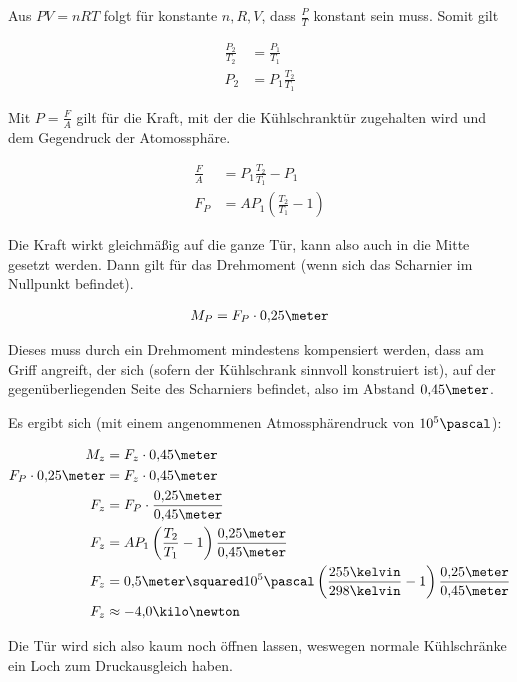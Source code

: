 \documentclass[a4paper,german,12pt,smallheadings]{scrartcl}
\begin{document}
Aus $PV = nRT$ folgt für konstante $n, R, V$, dass $\frac{P}{T}$ konstant sein muss. Somit gilt

\begin{align*}
  \frac{P_2}{T_2} &= \frac{P_1}{T_1} \\
  P_2 &= P_1 \frac{T_2}{T_1}
\end{align*}

Mit $P = \frac{F}{A}$ gilt für die Kraft, mit der die Kühlschranktür zugehalten wird und dem Gegendruck der Atomossphäre.

\begin{align*}
  \frac{F}{A} &= P_1 \frac{T_2}{T_1} - P_1 \\
  F_P &= A P_1 \left(\frac{T_2}{T_1} - 1\right)
\end{align*}

Die Kraft wirkt gleichmäßig auf die ganze Tür, kann also auch in die Mitte gesetzt werden. Dann gilt für das Drehmoment (wenn sich das Scharnier im Nullpunkt befindet).

\begin{align*}
  M_P = F_P \cdot 0{,}25 \meter
\end{align*}

Dieses muss durch ein Drehmoment mindestens kompensiert werden, dass am Griff
angreift, der sich (sofern der Kühlschrank sinnvoll konstruiert ist), auf der
gegenüberliegenden Seite des Scharniers befindet, also im Abstand $0{,}45
\meter$.

Es ergibt sich (mit einem angenommenen Atmossphärendruck von $10^5 \pascal$):

\begin{align*}
  M_z &= F_z \cdot 0{,}45 \meter \\
  F_P \cdot 0{,}25 \meter &= F_z \cdot 0{,}45 \meter \\
  F_z &= F_P \cdot \frac{0{,}25 \meter}{0{,}45 \meter} \\
  F_z &= A P_1 \left(\frac{T_2}{T_1} - 1\right) \frac{0{,}25 \meter}{0{,}45 \meter} \\
  F_z &= 0{,}5 \meter\squared 10^5 \pascal \left(\frac{255 \kelvin}{298 \kelvin} - 1\right) \frac{0{,}25 \meter}{0{,}45 \meter} \\
  F_z &\approx -4{,}0 \kilo\newton
\end{align*}

Die Tür wird sich also kaum noch öffnen lassen, weswegen normale Kühlschränke
ein Loch zum Druckausgleich haben.
\end{document}
